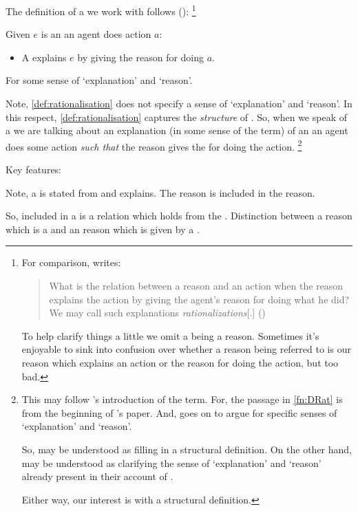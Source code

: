 \begin{note}
  The definition of a  we work with follows (\cite{Davidson:1963aa}):%
  \footnote{
    \label{fn:DRat}
    For comparison, \citeauthor{Davidson:1963aa} writes:
    \begin{quote}
      What is the relation between a reason and an action when the reason explains the action by giving the agent's reason for doing what he did?
      We may call such explanations \emph{rationalizations}[.]%
      \mbox{}\hfill\mbox{(\citeyear[685]{Davidson:1963aa})}
    \end{quote}
    To help clarify things a little we omit a \rationalisation{} being a reason.
    Sometimes it's enjoyable to sink into confusion over whether a reason being referred to is our reason which explains an action or the \agents{} reason for doing the action, but too bad.
  }

  \begin{definition}[\rationalisation{3}]%
    \label{def:rationalisation}%
    Given \(e\) is an  an agent does action \(a\):
    \begin{itemize}
    \item
      A \emph{} explains \(e\) by giving the \agents{} reason for doing \(a\).
    \end{itemize}
    For some sense of `explanation' and `reason'.
  \end{definition}

  \noindent%
  Note, \autoref{def:rationalisation} does not specify a sense of `explanation' and `reason'.
  In this respect, \autoref{def:rationalisation} captures the \emph{structure} of .
  So, when we speak of a  we are talking about an explanation (in some sense of the term) of an \eiw{} an agent does some action \emph{such that} the reason gives the \agents{} for doing the action.%
  \footnote{
    This may follow \citeauthor{Davidson:1963aa}'s introduction of the term.
    For, the passage in \autoref{fn:DRat} is from the beginning of \citeauthor{Davidson:1963aa}'s paper.
    And, \citeauthor{Davidson:1963aa} goes on to argue for specific senses of `explanation' and `reason'.

    So, \citeauthor{Davidson:1963aa} may be understood as filling in a structural definition.
    On the other hand, \citeauthor{Davidson:1963aa} may be understood as clarifying the sense of `explanation' and `reason' already present in their account of .

    Either way, our interest is with a structural definition.
  }

  Key features:

  Note, a \rationalisation{} is stated from  and explains.
  The \agents{} reason is included in the reason.

  So, included in a  is a relation which holds from the \agpe{}.
  Distinction between a reason which is a  and an \agents{} reason which is given by a .
\end{note}


